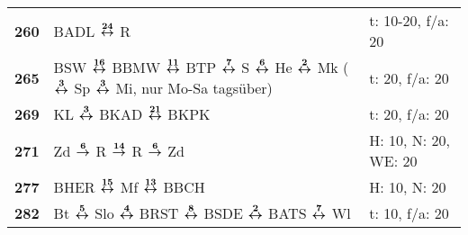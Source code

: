 \begin{minipage}[t]{0.45\textwidth}
\begin{tabular}{>{\bfseries}L{1.2cm}L{9.0cm}L{3.0cm}}
\bus{} 260    & BADL $\xarwe{24}$ R                                                                                                                                                 & t: 10-20, f/a: 20          \\
\bus{} 265    & BSW $\xarwe{16}$ BBMW $\xarwe{11}$ BTP $\xarwe{7}$ S $\xarwe{6}$ He $\xarwe{2}$ Mk ($\xarwe{3}$ Sp $\xarwe{3}$ Mi, nur Mo-Sa tagsüber)                              & t: 20, f/a: 20             \\
\bus{} 269    & KL $\xarwe{3}$ BKAD $\xarwe{21}$ BKPK
& t: 20, f/a: 20             \\
\bus{} 271    & Zd $\xarre{6}$ R $\xarre{14}$ R $\xarre{6}$ Zd                      & H: 10, N: 20, WE: 20 \\
\bus{} 277    & BHER $\xarwe{15}$ Mf $\xarwe{13}$ BBCH                                                                                                                              & H: 10, N: 20               \\
\bus{} 282    & Bt $\xarwe{5}$ Slo $\xarwe{4}$ BRST $\xarwe{8}$ BSDE $\xarwe{2}$ BATS $\xarwe{7}$ Wl                                                                                & t: 10, f/a: 20             \\
\hline
\end{tabular}
\end{minipage}
\begin{minipage}[t]{0.05\textwidth}
\phantom{Tor}
\end{minipage}

